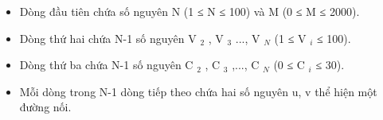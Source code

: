 \begin{itemize}
	\item Dòng đầu tiên chứa số nguyên N (1 ≤ N ≤ 100) và M (0 ≤ M ≤ 2000).
	\item Dòng thứ hai chứa N-1 số nguyên V $_ 2 $ , V $_ 3 $ ..., V $_ N $ (1 ≤ V $_ i $ ≤ 100).
	\item Dòng thứ ba chứa N-1 số nguyên C $_ 2 $ , C $_ 3 $ ,..., C $_ N $ (0 ≤ C $_ i $ ≤ 30).
	\item Mỗi dòng trong N-1 dòng tiếp theo chứa hai số nguyên u, v thể hiện một đường nối.
\end{itemize}

\